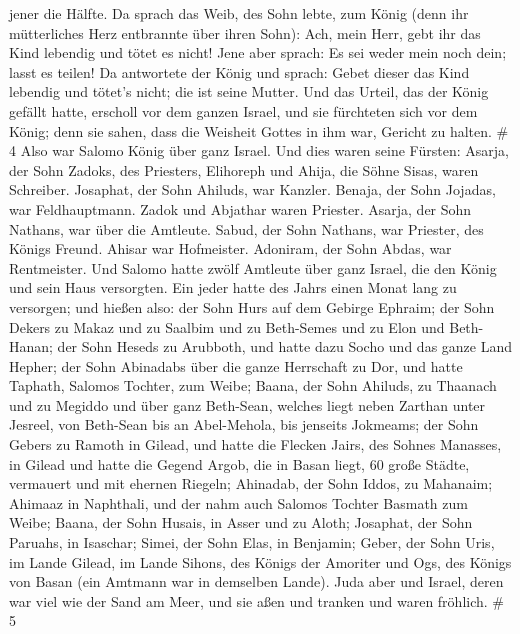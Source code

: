 jener die Hälfte.  Da sprach das Weib, des Sohn lebte, zum
König (denn ihr mütterliches Herz entbrannte über ihren Sohn): Ach, mein
Herr, gebt ihr das Kind lebendig und tötet es nicht! Jene aber sprach:
Es sei weder mein noch dein; lasst es teilen!  Da
antwortete der König und sprach: Gebet dieser das Kind lebendig und
tötet's nicht; die ist seine Mutter.  Und das Urteil, das
der König gefällt hatte, erscholl vor dem ganzen Israel, und sie
fürchteten sich vor dem König; denn sie sahen, dass die Weisheit Gottes
in ihm war, Gericht zu halten. \# 4  Also war Salomo König
über ganz Israel.  Und dies waren seine Fürsten: Asarja, der
Sohn Zadoks, des Priesters,  Elihoreph und Ahija, die Söhne
Sisas, waren Schreiber. Josaphat, der Sohn Ahiluds, war Kanzler.
 Benaja, der Sohn Jojadas, war Feldhauptmann. Zadok und
Abjathar waren Priester.  Asarja, der Sohn Nathans, war über
die Amtleute. Sabud, der Sohn Nathans, war Priester, des Königs Freund.
 Ahisar war Hofmeister. Adoniram, der Sohn Abdas, war
Rentmeister.  Und Salomo hatte zwölf Amtleute über ganz
Israel, die den König und sein Haus versorgten. Ein jeder hatte des
Jahrs einen Monat lang zu versorgen;  und hießen also: der
Sohn Hurs auf dem Gebirge Ephraim;  der Sohn Dekers zu Makaz
und zu Saalbim und zu Beth-Semes und zu Elon und Beth-Hanan;
 der Sohn Heseds zu Arubboth, und hatte dazu Socho und das
ganze Land Hepher;  der Sohn Abinadabs über die ganze
Herrschaft zu Dor, und hatte Taphath, Salomos Tochter, zum Weibe;
 Baana, der Sohn Ahiluds, zu Thaanach und zu Megiddo und
über ganz Beth-Sean, welches liegt neben Zarthan unter Jesreel, von
Beth-Sean bis an Abel-Mehola, bis jenseits Jokmeams;  der
Sohn Gebers zu Ramoth in Gilead, und hatte die Flecken Jairs, des Sohnes
Manasses, in Gilead und hatte die Gegend Argob, die in Basan liegt, 60
große Städte, vermauert und mit ehernen Riegeln;  Ahinadab,
der Sohn Iddos, zu Mahanaim;  Ahimaaz in Naphthali, und der
nahm auch Salomos Tochter Basmath zum Weibe;  Baana, der
Sohn Husais, in Asser und zu Aloth;  Josaphat, der Sohn
Paruahs, in Isaschar;  Simei, der Sohn Elas, in Benjamin;
 Geber, der Sohn Uris, im Lande Gilead, im Lande Sihons,
des Königs der Amoriter und Ogs, des Königs von Basan (ein Amtmann war
in demselben Lande).  Juda aber und Israel, deren war viel
wie der Sand am Meer, und sie aßen und tranken und waren fröhlich. \# 5
